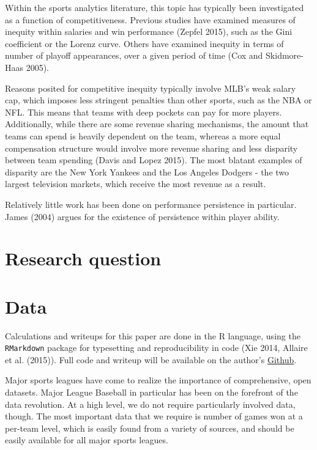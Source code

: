 \documentclass[11pt,]{scrartcl}
\begin{document}
Within the sports analytics literature, this topic has typically been
investigated as a function of competitiveness. Previous studies have
examined measures of inequity within salaries and win performance
(Zepfel 2015), such as the Gini coefficient or the Lorenz curve. Others
have examined inequity in terms of number of playoff appearances, over a
given period of time (Cox and Skidmore-Haas 2005).

Reasons posited for competitive inequity typically involve MLB's weak
salary cap, which imposes less stringent penalties than other sports,
such as the NBA or NFL. This means that teams with deep pockets can pay
for more players. Additionally, while there are some revenue sharing
mechanisms, the amount that teams can spend is heavily dependent on the
team, whereas a more equal compensation structure would involve more
revenue sharing and less disparity between team spending (Davis and
Lopez 2015). The most blatant examples of disparity are the New York
Yankees and the Los Angeles Dodgers - the two largest television
markets, which receive the most revenue as a result.

Relatively little work has been done on performance persistence in
particular. James (2004) argues for the existence of persistence within
player ability.

\section{Research question}\label{research-question}

\section{Data}\label{data}

Calculations and writeups for this paper are done in the R language,
using the \texttt{RMarkdown} package for typesetting and reproducibility
in code (Xie 2014, Allaire et al. (2015)). Full code and writeup will be
available on the author's
\href{https://github.com/stillmatic/thesis}{Github}.

Major sports leagues have come to realize the importance of
comprehensive, open datasets. Major League Baseball in particular has
been on the forefront of the data revolution. At a high level, we do not
require particularly involved data, though. The most important data that
we require is number of games won at a per-team level, which is easily
found from a variety of sources, and should be easily available for all
major sports leagues.
\end{document}
